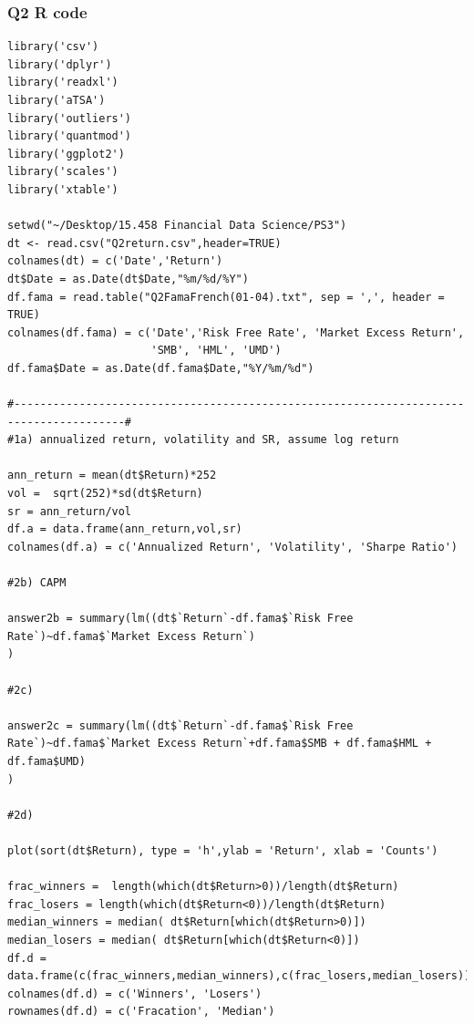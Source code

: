 \documentclass[10pt]{article}
\begin{document}
\subsubsection*{Q2 R code}
\begin{lstlisting}
library('csv')
library('dplyr')
library('readxl')
library('aTSA')
library('outliers')
library('quantmod')
library('ggplot2')
library('scales')
library('xtable')

setwd("~/Desktop/15.458 Financial Data Science/PS3")
dt <- read.csv("Q2return.csv",header=TRUE)
colnames(dt) = c('Date','Return')
dt$Date = as.Date(dt$Date,"%m/%d/%Y")
df.fama = read.table("Q2FamaFrench(01-04).txt", sep = ',', header = TRUE)
colnames(df.fama) = c('Date','Risk Free Rate', 'Market Excess Return',
                      'SMB', 'HML', 'UMD')
df.fama$Date = as.Date(df.fama$Date,"%Y/%m/%d")

#---------------------------------------------------------------------------------------#
#1a) annualized return, volatility and SR, assume log return

ann_return = mean(dt$Return)*252
vol =  sqrt(252)*sd(dt$Return)
sr = ann_return/vol
df.a = data.frame(ann_return,vol,sr)
colnames(df.a) = c('Annualized Return', 'Volatility', 'Sharpe Ratio')

#2b) CAPM

answer2b = summary(lm((dt$`Return`-df.fama$`Risk Free Rate`)~df.fama$`Market Excess Return`)
)

#2c) 

answer2c = summary(lm((dt$`Return`-df.fama$`Risk Free Rate`)~df.fama$`Market Excess Return`+df.fama$SMB + df.fama$HML + df.fama$UMD)
)

#2d)

plot(sort(dt$Return), type = 'h',ylab = 'Return', xlab = 'Counts')

frac_winners =  length(which(dt$Return>0))/length(dt$Return)
frac_losers = length(which(dt$Return<0))/length(dt$Return)
median_winners = median( dt$Return[which(dt$Return>0)])
median_losers = median( dt$Return[which(dt$Return<0)])
df.d = data.frame(c(frac_winners,median_winners),c(frac_losers,median_losers))
colnames(df.d) = c('Winners', 'Losers')
rownames(df.d) = c('Fracation', 'Median')


\end{lstlisting}
\end{document}

